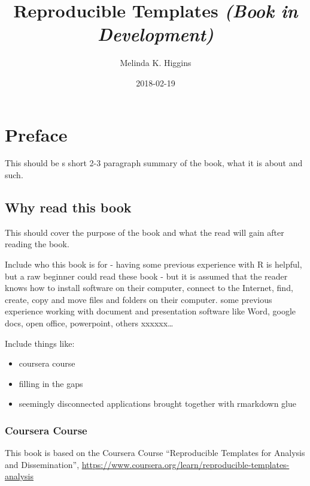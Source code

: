 \documentclass[]{book}
\title{Reproducible Templates \emph{(Book in Development)}}
\author{Melinda K. Higgins}
\date{2018-02-19}
\providecommand{\tightlist}{%
  \setlength{\itemsep}{0pt}\setlength{\parskip}{0pt}}
\theoremstyle{definition}
\theoremstyle{definition}
\theoremstyle{definition}
\theoremstyle{remark}
\begin{document}
\maketitle

{
\setcounter{tocdepth}{1}
\tableofcontents
}
\listoftables
\listoffigures
\chapter*{Preface}\label{preface}


This should be s short 2-3 paragraph summary of the book, what it is
about and such.

\section*{Why read this book}\label{why-read-this-book}

This should cover the purpose of the book and what the read will gain
after reading the book.

Include who this book is for - having some previous experience with R is
helpful, but a raw beginner could read these book - but it is assumed
that the reader knows how to install software on their computer, connect
to the Internet, find, create, copy and move files and folders on their
computer. some previous experience working with document and
presentation software like Word, google docs, open office, powerpoint,
others xxxxxx\ldots{}

Include things like:

\begin{itemize}
\tightlist
\item
  coursera course
\item
  filling in the gaps
\item
  seemingly disconnected applications brought together with rmarkdown
  glue
\end{itemize}

\subsection*{Coursera Course}\label{coursera-course}

This book is based on the Coursera Course ``Reproducible Templates for
Analysis and Dissemination'',
\url{https://www.coursera.org/learn/reproducible-templates-analysis}
\end{document}
